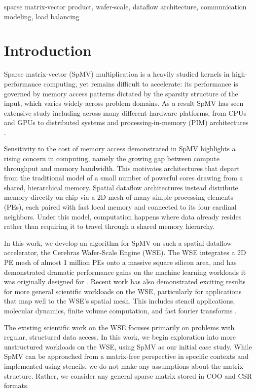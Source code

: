\documentclass[conference]{IEEEtran}
\begin{document}
\begin{IEEEkeywords}
    sparse matrix-vector product, wafer-scale, dataflow architecture, communication modeling, load balancing
\end{IEEEkeywords}

\section{Introduction}
Sparse matrix-vector (SpMV) multiplication is a heavily studied kernels in high-performance computing, yet remains difficult to accelerate: its performance is governed by memory access patterns dictated by the sparsity structure of the input, which varies widely across problem domains. As a result SpMV has seen extensive study including across many different hardware platforms, from CPUs and GPUs to distributed systems and processing-in-memory (PIM) architectures \cite{gao2024systematicliteraturesurveysparse,surveyspmv}.

Sensitivity to the cost of memory access demonstrated in SpMV highlights a rising concern in computing, namely the growing gap between compute throughput and memory bandwidth. This motivates architectures that depart from the
traditional model of a small number of powerful cores drawing from a shared, hierarchical
memory. Spatial dataflow architectures instead distribute memory directly on chip via a 2D
mesh of many simple processing elements (PEs), each paired with fast local memory and
connected to its four cardinal neighbors. Under this model, computation happens where data already
resides rather than requiring it to travel through a shared memory hierarchy.

In this work, we develop an algorithm for SpMV on such a spatial dataflow accelerator, the Cerebras Wafer-Scale Engine (WSE). The WSE integrates a 2D PE mesh of almost 1 million PEs onto a massive square silicon area, and has demonstrated dramatic performance gains on the machine learning workloads it was originally designed for \cite{benchmarkllms,cerebras-blog,cerebras_story}.
Recent work has also demonstrated exciting results for more general scientific workloads on the WSE, particularly for applications that map well to the WSE's spatial mesh. This includes stencil applications, molecular dynamics, finite volume computation, and fast fourier transforms \cite{wse_faststencil_rocki,wse_md,wse_mcpt,wse_stencil_jacquelin}.

The existing scientific work on the WSE focuses primarily on problems with regular, structured data access. In this work, we begin exploration into more unstructured workloads on the WSE, using SpMV as our initial case study. While SpMV can be approached from a matrix-free perspective in specific contexts and implemented using stencils, we do not make any assumptions about the matrix structure. Rather, we consider any general sparse matrix stored in COO and CSR formats.
\end{document}
